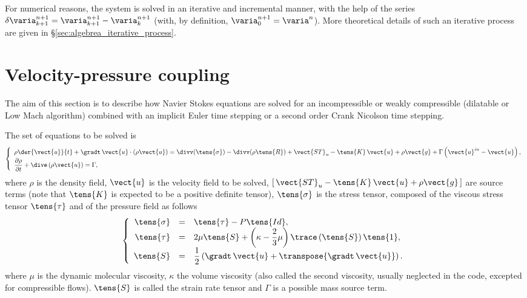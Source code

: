 For numerical reasons, the system is solved in an iterative and incremental
manner, with the help of the series $\delta \varia^{n+1}_{k+1}=\varia^{n+1}_{k+1}-\varia^{n+1}_{k}$
(with, by definition, $\varia^{n+1}_0=\varia^{n}$).
More theoretical details of such an iterative process are given in \S \ref{sec:algebrea_iterative_process}.

\section{Velocity-pressure coupling}\label{sec:timstp:velocity_pressure_coupling}
The aim of this section is to describe how Navier Stokes equations are solved for an incompressible
or weakly compressible (dilatable or Low Mach algorithm) combined with an
implicit Euler time stepping or a second order Crank Nicolson time stepping.

The set of equations to be solved is
\begin{equation}\label{eq:timstp:navier_stokes}
\left\{\begin{array}{l}
\displaystyle \rho \der{\vect{u}}{t} + \gradt \, \vect{u} \cdot \left( \rho\vect{u}  \right)
=\divv(\tens{\sigma}) - \divv(\rho \tens{R}) + \vect{ST}_u - \tens{K}\,\vect{u} + \rho \vect{g} + \Gamma \left( \vect{u}^{in} - \vect{u} \right), \\
\dfrac{\partial \rho}{\partial t} + \dive\left( \rho \vect{u} \right) = \Gamma ,
\end{array}\right.
\end{equation}
%
where $\rho$ is the density field, $\vect{u}$ is the velocity field to be solved,
$[\,\vect{ST}_u-\tens{K}\,\vect{u} + \rho \vect{g} \,]$  are source terms (note that $\tens{K}$ is expected to be a positive definite tensor),
 $\tens{\sigma}$ is the stress tensor, composed of the viscous stress tensor $\tens{\tau}$ and of the pressure field as follows
\begin{equation}
\left\{\begin{array}{r c l}
\tens{\sigma} &=& \tens{\tau} - P\tens{Id} , \\%
\tens{\tau} & =& 2 \mu  \tens{S} +   \left( \kappa - \dfrac{2}{3}\mu \right)   \trace \left( \tens{S} \right) \tens{1} ,\\
\tens{S} &=& \dfrac{1}{2} \left( \gradt \, \vect{u}+\transpose{\gradt \, \vect{u}} \right) .
\end{array}\right.
\end{equation}
 where  $\mu$ is the dynamic molecular viscosity,
 $\kappa$ the volume viscosity (also called the second viscosity, usually neglected in the code, excepted for compressible flows).
$\tens{S}$ is called the strain rate tensor and  $\Gamma$ is a possible mass source term.

